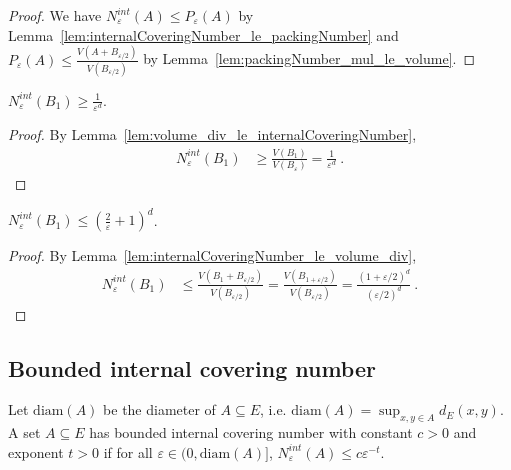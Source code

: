 \begin{proof}\leanok
We have $N^{int}_\varepsilon(A) \le P_\varepsilon(A)$ by Lemma~\ref{lem:internalCoveringNumber_le_packingNumber} and $P_\varepsilon(A) \le \frac{V(A + B_{\varepsilon/2})}{V(B_{\varepsilon/2})}$ by Lemma~\ref{lem:packingNumber_mul_le_volume}.
\end{proof}


\begin{lemma}\label{lem:internalCoveringNumber_closedBall_ge}
  \leanok
$N_\varepsilon^{int}(B_1) \ge \frac{1}{\varepsilon^d}$.
\end{lemma}

\begin{proof}\leanok
By Lemma~\ref{lem:volume_div_le_internalCoveringNumber},
\begin{align*}
  N^{int}_\varepsilon(B_1)
  &\ge \frac{V(B_1)}{V(B_\varepsilon)}
  = \frac{1}{\varepsilon^d}
  \: .
\end{align*}

\end{proof}


\begin{lemma}\label{lem:internalCoveringNumber_closedBall_le}
  \leanok
$N_\varepsilon^{int}(B_1) \le \left(\frac{2}{\varepsilon} + 1\right)^d$.
\end{lemma}

\begin{proof}\leanok
By Lemma~\ref{lem:internalCoveringNumber_le_volume_div},
\begin{align*}
  N^{int}_\varepsilon(B_1)
  &\le \frac{V(B_1 + B_{\varepsilon/2})}{V(B_{\varepsilon/2})}
  = \frac{V(B_{1 + \varepsilon/2})}{V(B_{\varepsilon/2})}
  = \frac{(1 + \varepsilon/2)^d}{(\varepsilon/2)^d}
  \: .
\end{align*}
\end{proof}


\subsection{Bounded internal covering number}

\begin{definition}\label{def:HasBoundedInternalCoveringNumber}
  \leanok
  Let $\mathrm{diam}(A)$ be the diameter of $A \subseteq E$, i.e. $\mathrm{diam}(A) = \sup_{x,y \in A} d_E(x, y)$.
  A set $A \subseteq E$ has bounded internal covering number with constant $c>0$ and exponent $t>0$ if for all $\varepsilon \in (0, \mathrm{diam}(A)]$, $N^{int}_\varepsilon(A) \le c \varepsilon^{-t}$.
\end{definition}


